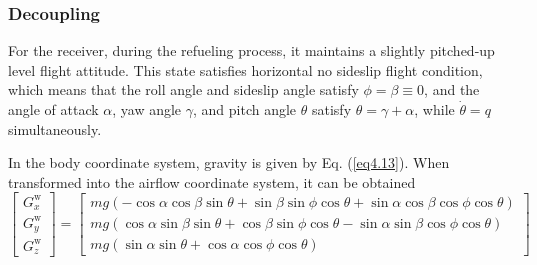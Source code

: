 \subsubsection{Decoupling}

For the receiver, during the refueling process, it maintains a slightly pitched-up level flight attitude. This state satisfies horizontal no sideslip flight condition, which means that the roll angle and sideslip angle satisfy $\phi  = \beta  \equiv 0$, and the angle of attack $\alpha$, yaw angle $\gamma$, and pitch angle $\theta$ satisfy $\theta  = \gamma  + \alpha $, while $\dot \theta  = q$ simultaneously.

In the body coordinate system, gravity is given by Eq. (\ref{eq4.13}). When transformed into the airflow coordinate system, it can be obtained
\begin{equation}\label{eq4.51}
\left[ \begin{array}{l}
G_x^\mathrm{w}\\
G_y^\mathrm{w}\\
G_z^\mathrm{w}
\end{array} \right] = \left[ \begin{array}{c}
mg\left( { - \cos \alpha \cos \beta \sin \theta  + \sin \beta \sin \phi \cos \theta  + \sin \alpha \cos \beta \cos \phi \cos \theta } \right)\\
mg\left( {\cos \alpha \sin \beta \sin \theta  + \cos \beta \sin \phi \cos \theta  - \sin \alpha \sin \beta \cos \phi \cos \theta } \right)\\
mg\left( {\sin \alpha \sin \theta  + \cos \alpha \cos \phi \cos \theta } \right)
\end{array} \right]
\end{equation}

